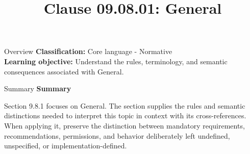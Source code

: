 \documentclass[10pt,letterpaper]{article}
\title{Clause 09.08.01: General}
\author{}
\date{}
\begin{document}
\maketitle
\begin{CornellOverviewBox}{Overview}
\textbf{Classification:} Core language - Normative\\[2pt]
\textbf{Learning objective:} Understand the rules, terminology, and semantic consequences associated with General.
\end{CornellOverviewBox}\begin{CornellSummaryBox}{Summary}
{\sffamily\bfseries\color{Accent} Summary}\par\vspace{3pt}Section 9.8.1 focuses on General. The section supplies the rules and semantic distinctions needed to interpret this topic in context with its cross-references. When applying it, preserve the distinction between mandatory requirements, recommendations, permissions, and behavior deliberately left undefined, unspecified, or implementation-defined.
\end{CornellSummaryBox}
\end{document}
